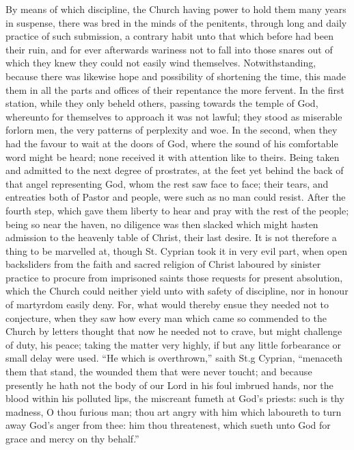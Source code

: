 By means of which discipline, the Church having power to hold them many years in suspense, there was bred in the minds of the penitents, through long and daily practice of such submission, a contrary habit unto that which before had been their ruin, and for ever afterwards wariness not to fall into those snares out of which they knew they could not easily wind themselves. Notwithstanding, because there was likewise hope and possibility of shortening the time, this made them in all the parts and offices of their repentance the more fervent. In the first station, while they only beheld others, passing towards the temple of God, whereunto for themselves  to approach it was not lawful; they stood as miserable forlorn men, the very patterns of perplexity and woe. In the second, when they had the favour to wait at the doors of God, where the sound of his comfortable word might be heard; none received it with attention like to theirs. Being taken and admitted to the next degree of prostrates, at the feet yet behind the back of that angel representing God, whom the rest saw face to face; their tears, and entreaties both of Pastor and people, were such as no man could resist. After the fourth step, which gave them liberty to hear and pray with the rest of the people; being so near the haven, no diligence was then slacked which might hasten admission to the heavenly table of Christ, their last desire. It is not therefore a thing to be marvelled at, though St. Cyprian took it in very evil part, when open backsliders from the faith and sacred religion of Christ laboured by sinister practice to procure from imprisoned saints those requests for present absolution, which the Church could neither yield unto with safety of discipline, nor in honour of martyrdom easily deny. For, what would thereby ensue they needed not to conjecture, when they saw how every man which came so commended to the Church by letters thought that now he needed not to crave, but might challenge of duty, his peace; taking the matter very highly, if but any little forbearance or small delay were used. “He which is overthrown,” saith St.g Cyprian, “menaceth them that stand, the wounded them that were never toucht; and because presently he hath not the body of our Lord in his foul imbrued hands, nor the blood within his polluted lips, the miscreant fumeth at God’s priests: such is thy madness, O thou furious man; thou art angry with him which laboureth to turn away God’s anger from thee: him thou threatenest, which sueth unto God for grace and mercy on thy behalf.”


